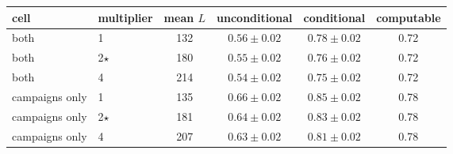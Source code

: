 \begin{tabular*}{\tabwidth}{@{\extracolsep{\fill}}llcccc@{}}
\toprule
cell & multiplier & mean $L$ & unconditional & conditional & computable\\
\midrule
both & 1 & 132 & $0.56\pm0.02$ & $0.78\pm0.02$ & 0.72 \\
both & 2$\star$ & 180 & $0.55\pm0.02$ & $0.76\pm0.02$ & 0.72 \\
both & 4 & 214 & $0.54\pm0.02$ & $0.75\pm0.02$ & 0.72 \\
campaigns only & 1 & 135 & $0.66\pm0.02$ & $0.85\pm0.02$ & 0.78 \\
campaigns only & 2$\star$ & 181 & $0.64\pm0.02$ & $0.83\pm0.02$ & 0.78 \\
campaigns only & 4 & 207 & $0.63\pm0.02$ & $0.81\pm0.02$ & 0.78 \\
\bottomrule
\end{tabular*}
